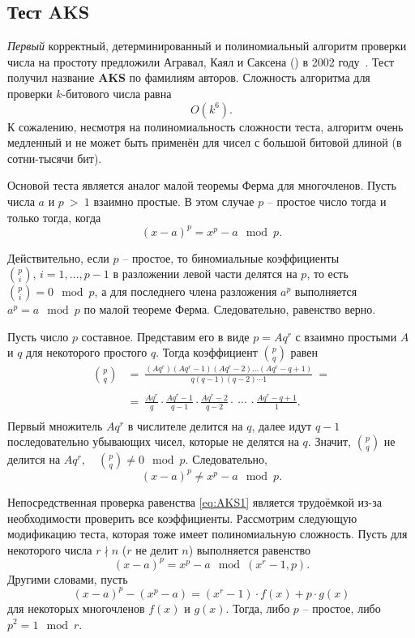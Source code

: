 \subsection{Тест AKS}\label{section-prime-check-aks}

\emph{Первый} корректный, детерминированный и полиномиальный алгоритм проверки числа на простоту предложили Агравал, Каял и Саксена () в 2002 году~\cite{aks:2002}. Тест получил название \textbf{AKS} по фамилиям авторов. Сложность алгоритма для проверки $k$-битового числа равна
    \[ O(k^{6}). \]
К сожалению, несмотря на полиномиальность сложности теста, алгоритм очень медленный и не может быть применён для чисел с большой битовой длиной (в сотни-тысячи бит).

Основой теста является аналог малой теоремы Ферма для многочленов. Пусть числа $a$ и $p~>~1$ взаимно простые. В этом случае $p$ -- простое число тогда и только тогда, когда
\begin{equation}
    \label{eq:AKS1}
    (x - a)^p = x^p - a \mod p.
\end{equation}

Действительно, если $p$ -- простое, то биномиальные коэффициенты $\binom{p}{i},\, i = 1, \dots, p-1$ в разложении левой части делятся на $p$, то есть ~ $\binom{p}{i} = 0 \mod p$, а для последнего члена разложения $a^p$ выполняется $a^p = a \mod p$ по малой теореме Ферма. Следовательно, равенство верно.

Пусть число $p$ составное. Представим его в виде $p = A q^r$ с взаимно простыми $A$ и $q$ для некоторого простого $q$. Тогда коэффициент $\binom{p}{q}$ равен
\[\begin{array}{rl}
    \binom{p}{q} & =~ \frac{(A q^r) (A q^r - 1)(A q^r - 2) \dots (A q^r - q + 1)}{q (q-1)(q-2) \cdots 1} ~= \\
    & \\
    & =~ \frac{A q^r}{q} \cdot \frac{A q^r - 1}{q-1} \cdot \frac{A q^r - 2}{q-2} \cdot ~\cdots~ \cdot \frac{A q^r - q + 1}{1}. \\
\end{array} \]
Первый множитель $A q^r$ в числителе делится на $q$, далее идут \mbox{$q-1$} последовательно убывающих чисел, которые не делятся на $q$. Значит, $\binom{p}{q}$ не делится на $A q^r$, ~ $\binom{p}{q} \neq 0 \mod p$. Следовательно,
\[
(x - a)^p \neq x^p - a \mod p.
\]

Непосредственная проверка равенства \eqref{eq:AKS1} является трудоёмкой из-за необходимости проверить все коэффициенты. Рассмотрим следующую модификацию теста, которая тоже имеет полиномиальную сложность. Пусть для некоторого числа $r \nmid n$ ($r$ не делит $n$) выполняется равенство
\begin{equation}
    \label{eq:AKS2}
    (x - a)^p = x^p - a \mod (x^r-1, p).
\end{equation}
Другими словами, пусть
    \[ (x - a)^p - (x^p - a) = (x^r-1) \cdot f(x) + p \cdot g(x) \]
для некоторых многочленов $f(x)$ и $g(x)$. Тогда, либо $p$ -- простое, либо $p^2 = 1 \mod r$.

